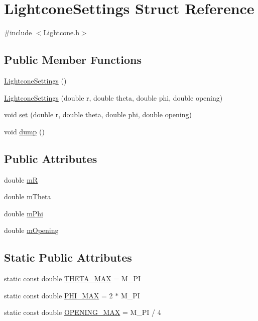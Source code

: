 \hypertarget{structLightconeSettings}{}\section{Lightcone\+Settings Struct Reference}
\label{structLightconeSettings}


{\ttfamily \#include $<$Lightcone.\+h$>$}

\subsection*{Public Member Functions}
\begin{DoxyCompactItemize}
\item 
\hyperlink{structLightconeSettings_a819d92e610bcaeb64d700bf04ba80bdf}{Lightcone\+Settings} ()
\item 
\hyperlink{structLightconeSettings_a67e62da8d103761add3479ec1ada892a}{Lightcone\+Settings} (double r, double theta, double phi, double opening)
\item 
void \hyperlink{structLightconeSettings_a6349d6f0c8e225cf47988a02a8d48152}{set} (double r, double theta, double phi, double opening)
\item 
void \hyperlink{structLightconeSettings_a8750403e5d117e5842a3261f83e9721e}{dump} ()
\end{DoxyCompactItemize}
\subsection*{Public Attributes}
\begin{DoxyCompactItemize}
\item 
double \hyperlink{structLightconeSettings_aeff96d043c5d6a91aaa682fdc0f1bcdc}{m\+R}
\item 
double \hyperlink{structLightconeSettings_a65ddb1d59b467d53f9df135fb5530008}{m\+Theta}
\item 
double \hyperlink{structLightconeSettings_ac325b952ef76bbcdcf061a7fb1abda89}{m\+Phi}
\item 
double \hyperlink{structLightconeSettings_a899b55c3290f2c0d3d825114a6acc13f}{m\+Opening}
\end{DoxyCompactItemize}
\subsection*{Static Public Attributes}
\begin{DoxyCompactItemize}
\item 
static const double \hyperlink{structLightconeSettings_adc80dcb7ac50ce4ddb5fe1d0146f3006}{T\+H\+E\+T\+A\+\_\+\+M\+A\+X} = M\+\_\+\+P\+I
\item 
static const double \hyperlink{structLightconeSettings_a482009f7c776c60272434870fd10a5e9}{P\+H\+I\+\_\+\+M\+A\+X} = 2 $\ast$ M\+\_\+\+P\+I
\item 
static const double \hyperlink{structLightconeSettings_a84fe32a28ec1c71f5131bf79dde76b77}{O\+P\+E\+N\+I\+N\+G\+\_\+\+M\+A\+X} = M\+\_\+\+P\+I / 4
\end{DoxyCompactItemize}


